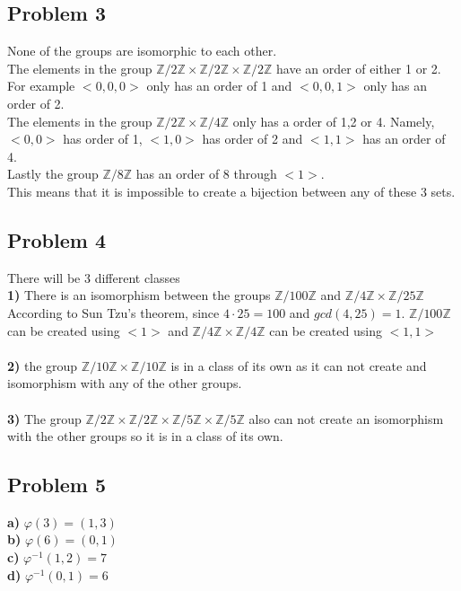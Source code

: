 \documentclass[12pt]{article}
\newcommand{\Z}{\mathbb{Z}}
\begin{document}
\subsection*{Problem 3}
None of the groups are isomorphic to each other.\\
The elements in the group $\Z/2\Z \times \Z/2\Z \times \Z/2\Z$ have an order of either 1 or 2. For example $<0,0,0>$ only has an order of 1 and $<0,0,1>$ only has an order of 2. \\
The elements in the group $\Z/2\Z \times \Z/4\Z$ only has a order of 1,2 or 4. Namely, $<0,0>$ has order of 1, $<1,0>$ has order of 2 and $<1,1>$ has an order of 4.\\
Lastly the group $\Z/8\Z$ has an order of 8 through $<1>$.\\
This means that it is impossible to create a bijection between any of these 3 sets.
\subsection*{Problem 4}
There will be 3 different classes\\
\textbf{1) } There is an isomorphism between the groups $\Z/100\Z$ and $\Z/4\Z \times \Z/25\Z$ According to Sun Tzu's theorem, since $4 \cdot 25 = 100$ and $gcd(4,25) = 1$. $\Z/100\Z$ can be created using $<1>$ and $\Z/4\Z \times \Z/4\Z$ can be created using $<1,1>$\\\\
\textbf{2) } the group $\Z/10\Z \times \Z/10\Z$ is in a class of its own as it can not create and isomorphism with any of the other groups.\\\\
\textbf{3) } The group $\Z/2\Z \times \Z/2\Z \times \Z/5\Z \times \Z/5\Z$ also can not create an isomorphism with the other groups so it is in a class of its own.
\subsection*{Problem 5}
\textbf{a) } $\varphi(3) = (1,3)$\\
\textbf{b) } $\varphi(6) = (0,1)$\\
\textbf{c) } $\varphi^{-1}(1,2) = 7$\\
\textbf{d) } $\varphi^{-1}(0,1) = 6$
\end{document}

